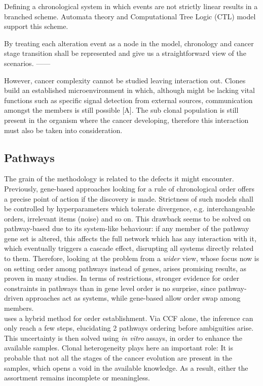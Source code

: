 Defining a chronological system in which events are not strictly linear results in a branched scheme. Automata theory and Computational Tree Logic (CTL) model support this scheme.

By treating each alteration event as a node in the model, chronology and cancer stage transition shall be represented and give us a straightforward view of the scenarios.
------

However, cancer complexity cannot be studied leaving interaction out. Clones build an established microenvironment in which, although might be lacking vital functions such as specific signal detection from external sources, communication amongst the members is still possible [A]. The sub clonal population is still present in the organism where the cancer developing, therefore this interaction must also be taken into consideration.


\subsection{Pathways}
The grain of the methodology is related to the defects it might encounter. Previously, gene-based approaches looking for a rule of chronological order offers a precise point of action if the discovery is made. Strictness of such models shall be controlled by hyperparameters which tolerate divergence, e.g. interchangeable orders, irrelevant items (noise) and so on.
This drawback seems to be solved on pathway-based due to its system-like behaviour: if any member of the pathway gene set is altered, this affects the full network which has any interaction with it, which eventually triggers a cascade effect, disrupting all systems directly related to them. Therefore, looking at the problem from a \emph{wider} view, whose focus now is on setting order among pathways instead of genes, arises promising results, as proven in many studies.
In terms of restrictions, stronger evidence for order constraints in pathways than in gene level order is no surprise, since pathway-driven approaches act as systems, while gene-based allow order swap among members.
\\

\cite{Cheng2012AGliomagenesis} uses a hybrid method for order establishment. Via CCF alone, the inference can only reach a few steps, elucidating 2 pathways ordering before ambiguities arise. This uncertainty is then solved using \emph{in vitro} assays, in order to enhance the available samples. Clonal heterogeneity plays here an important role: It is probable that not all the stages of the cancer evolution are present in the samples, which opens a void in the available knowledge. As a result, either the assortment remains incomplete or meaningless.
\\

